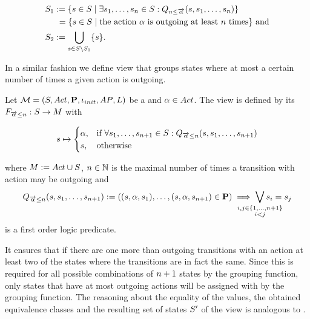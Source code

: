 \documentclass[preview]{standalone}
\begin{document}
\begin{align*}
	\states_1 &:= \{\state \in \states \mid \exists \state_1, \dots, \state_\numoutact \in \states: \predminoutact\} \\ %
	&\hspace{1.15mm}= \{\state \in \states \mid \text{the action } \action \text{ is outgoing at least } \numoutact \text{ times} \} \text{ and} \\
	\states_2 &:= \remstates.	
\end{align*}

In a similar fashion we define view that groups states where at most a certain number of times a given action is outgoing. 

\begin{definition}
	Let ${{{\mathcal{M}}}} = {{({S}, {Act}, {\textbf{P}}, {\iota_{init}}, {AP}, {L})}}$ be a \chosengraphtypeN and ${\alpha} \in {Act}$. The view \viewmaxoutaction is defined by its \grpfctN ${{{{F}}_{{\overrightarrow{{\alpha}}}\leq{n}}}} : {S} \to {M}$ with
	
	\[
	{s} \mapsto
	\begin{cases}
		{\alpha},				& \text{if } \forall {s}_1, \dots, {s}_{{n}+1} \in {S}: {Q_{{\overrightarrow{{\alpha}}}\leq{n}}({s},{s}_1, \dots, {s}_{{n}+1})} \\
		{s},          	& \text{otherwise}
	\end{cases}
	\]
	
	where ${{M}} := {Act} \cup {S}$, ${n} \in {\mathbb{N}}$ is the maximal number of times a transition with action \action may be outgoing and 
	\[
	\predmaxoutact := ((\state, \action, \state_1), \dots, (\state, \action, \state_{\numoutact+1}) \in \trans) \implies \bigvee_{\mathclap{\substack{i,j \in \{1,\dots, \numoutact+1\} \\ i < j}}} \state_i = \state_j
	\]
	is a first order logic predicate.
	\label{def:viewmaxoutaction}
\end{definition}

 It ensures that if there are one more than \numoutact outgoing transitions with an action \action at least two of the states where the transitions  are in fact the same. Since this is required for all possible combinations of ${n} + 1$ states by the grouping function, only states that have at most \numoutact outgoing actions will be assigned with \action by the grouping function. The reasoning about the equality of the \grpfctN values, the obtained equivalence classes and the resulting set of states ${S}'$ of the view is analogous to \viewminoutaction.
\end{document}
